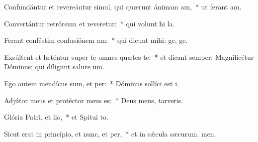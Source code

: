 \item Confundántur et revereántur simul, qui quærunt ánimam am,~* ut ferant am.
\item Convertántur retrórsum et reveretur:~* qui volunt hi la.
\item Ferant conféstim confusiónem am:~* qui dicunt mihi: ge, ge.
\item Exsúltent et læténtur super te omnes quætes te:~* et dicant semper: Magnificétur Dóminus: qui díligunt salure um.
\item Ego autem mendícus sum, et per:~* Dóminus sollíci est i.
\item Adjútor meus et protéctor meus  es:~* Deus meus,  tarveris.
\item Glória Patri, et lio,~* et Spitui to.
\item Sicut erat in princípio, et nunc, et per,~* et in sǽcula sæcurum. men.

